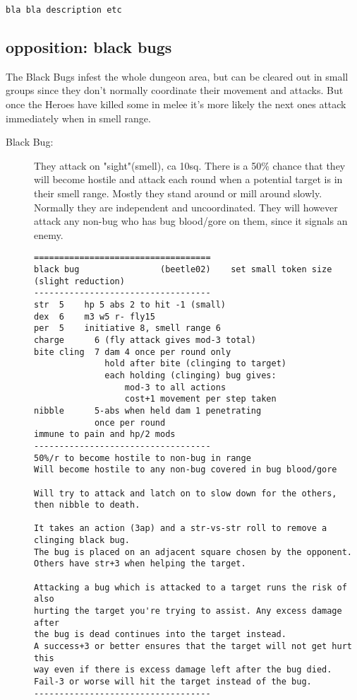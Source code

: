 \small \begin{verbatim}
bla bla description etc
\end{verbatim} \normalsize


\subsection*{opposition: black bugs}

The Black Bugs infest the whole dungeon area, but can be cleared out in small groups since they don't normally coordinate their movement and attacks. But once the Heroes have killed some in melee it's more likely the next ones attack immediately when in smell range.

\begin{description}

\item[Black Bug:] They attack on "sight"(smell), ca 10sq. There is a 50\% chance that they will become hostile and attack each round when a potential target is in their smell range. Mostly they stand around or mill around slowly. Normally they are independent and uncoordinated. They will however attack any non-bug who has bug blood/gore on them, since it signals an enemy.
\goodbreak \begin{samepage} \small \begin{verbatim}
===================================
black bug                (beetle02)    set small token size (slight reduction)
-----------------------------------
str  5    hp 5 abs 2 to hit -1 (small)
dex  6    m3 w5 r- fly15
per  5    initiative 8, smell range 6
charge      6 (fly attack gives mod-3 total)
bite cling  7 dam 4 once per round only
              hold after bite (clinging to target)
              each holding (clinging) bug gives:
                  mod-3 to all actions
                  cost+1 movement per step taken
nibble      5-abs when held dam 1 penetrating
            once per round
immune to pain and hp/2 mods
-----------------------------------
50%/r to become hostile to non-bug in range
Will become hostile to any non-bug covered in bug blood/gore

Will try to attack and latch on to slow down for the others,
then nibble to death.

It takes an action (3ap) and a str-vs-str roll to remove a clinging black bug.
The bug is placed on an adjacent square chosen by the opponent.
Others have str+3 when helping the target.

Attacking a bug which is attacked to a target runs the risk of also
hurting the target you're trying to assist. Any excess damage after
the bug is dead continues into the target instead.
A success+3 or better ensures that the target will not get hurt this
way even if there is excess damage left after the bug died.
Fail-3 or worse will hit the target instead of the bug.
-----------------------------------
\end{verbatim} \normalsize \end{samepage}


\end{description}
